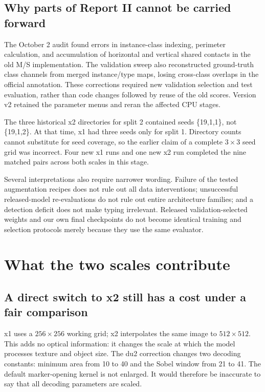 \documentclass[11pt,a4paper]{article}
\begin{document}
\subsection{Why parts of Report II cannot be carried forward}

The October 2 audit found errors in instance-class indexing, perimeter calculation, and accumulation of horizontal and vertical shared contacts in the old M/S implementation. The validation sweep also reconstructed ground-truth class channels from merged instance/type maps, losing cross-class overlaps in the official annotation. These corrections required new validation selection and test evaluation, rather than code changes followed by reuse of the old scores. Version v2 retained the parameter menus and reran the affected CPU stages.

The three historical x2 directories for split 2 contained seeds \{19,1,1\}, not \{19,1,2\}. At that time, x1 had three seeds only for split 1. Directory counts cannot substitute for seed coverage, so the earlier claim of a complete $3\times3$ seed grid was incorrect. Four new x1 runs and one new x2 run completed the nine matched pairs across both scales in this stage.

Several interpretations also require narrower wording. Failure of the tested augmentation recipes does not rule out all data interventions; unsuccessful released-model re-evaluations do not rule out entire architecture families; and a detection deficit does not make typing irrelevant. Released validation-selected weights and our own final checkpoints do not become identical training and selection protocols merely because they use the same evaluator.

\section{What the two scales contribute}

\subsection{A direct switch to x2 still has a cost under a fair comparison}

x1 uses a $256\times256$ working grid; x2 interpolates the same image to $512\times512$. This adds no optical information: it changes the scale at which the model processes texture and object size. The du2 correction changes two decoding constants: minimum area from 10 to 40 and the Sobel window from 21 to 41. The default marker-opening kernel is not enlarged. It would therefore be inaccurate to say that all decoding parameters are scaled.
\end{document}
